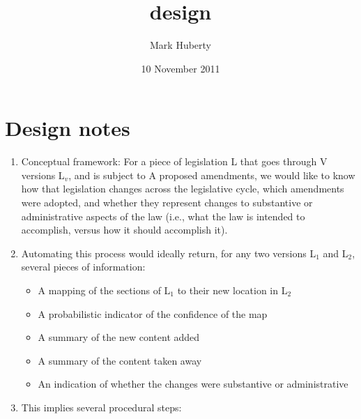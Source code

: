 \documentclass[11pt]{article}
\title{design}
\author{Mark Huberty}
\date{10 November 2011}
\begin{document}
\maketitle

\setcounter{tocdepth}{3}
\tableofcontents
\vspace*{1cm}
\section{Design notes}
\label{sec-1}

\begin{enumerate}
\item Conceptual framework:
   For a piece of legislation L that goes through V versions L$_v$, and is
   subject to A proposed amendments, we would like to know how that
   legislation changes across the legislative cycle, which amendments
   were adopted, and whether they represent changes to substantive or
   administrative aspects of the law (i.e., what the law is intended
   to accomplish, versus how it should accomplish it).
\item Automating this process would ideally return, for any two versions
   L$_1$ and L$_2$, several pieces of information:

\begin{itemize}
\item A mapping of the sections of L$_1$ to their new location in L$_2$
\item A probabilistic indicator of the confidence of the map
\item A summary of the new content added
\item A summary of the content taken away
\item An indication of whether the changes were substantive or
     administrative
\end{itemize}

\item This implies several procedural steps:


\end{enumerate}
\end{document}
